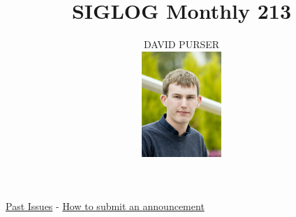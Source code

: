 \documentclass[prodmode,acmtecs]{acmsmall} %
\newcounter{colstart}
\begin{document}
\setcounter{colstart}{\thepage}

\title{\huge\sc SIGLOG Monthly 213}
\author{DAVID PURSER
\vspace*{-2.6cm}\begin{flushright}\includegraphics[width=30mm]{dp}\end{flushright}
}

\maketitlee

\href{https://lics.siglog.org/newsletters/}{Past Issues}
 - 
\href{https://lics.siglog.org/newsletters/inst.html}{How to submit an announcement}
\end{document}
